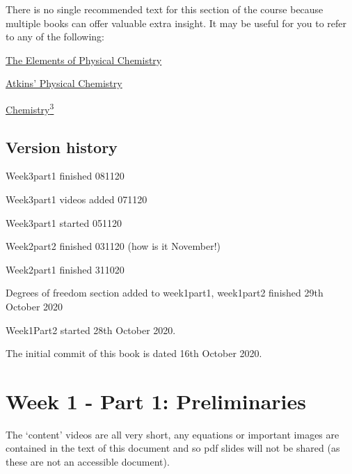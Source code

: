 \documentclass[
]{book}
\begin{document}
There is no single recommended text for this section of the course because multiple books can offer valuable extra insight. It may be useful for you to refer to any of the following:

\href{https://bath-ac-primo.hosted.exlibrisgroup.com/primo-explore/search?query=any,contains,Elements\%20of\%20physical\%20chemistry\&tab=local\&sortby=date\&vid=44BAT_VU1\&facet=frbrgroupid,include,978286819\&offset=0\&pcAvailability=false}{The Elements of Physical Chemistry}

\href{https://bath-ac-primo.hosted.exlibrisgroup.com/primo-explore/search?query=any,contains,physical\%20chemistry\%20de\%20paula\&tab=local\&search_scope=CSCOP_44BAT_DEEP\&sortby=date\&vid=44BAT_VU1\&facet=frbrgroupid,include,978327499\&offset=0\&pcAvailability=false}{Atkins' Physical Chemistry}

\href{https://bath-ac-primo.hosted.exlibrisgroup.com/primo-explore/search?query=any,contains,chemistry3\&tab=local\&search_scope=CSCOP_44BAT_DEEP\&sortby=date\&vid=44BAT_VU1\&facet=frbrgroupid,include,978293871\&offset=0\&pcAvailability=false}{Chemistry\textsuperscript{3}}

\hypertarget{version-history}{%
\section*{Version history}\label{version-history}}

Week3part1 finished 081120

Week3part1 videos added 071120

Week3part1 started 051120

Week2part2 finished 031120 (how is it November!)

Week2part1 finished 311020

Degrees of freedom section added to week1part1, week1part2 finished 29th October 2020

Week1Part2 started 28th October 2020.

The initial commit of this book is dated 16th October 2020.

\hypertarget{ch:Part1}{%
\chapter{Week 1 - Part 1: Preliminaries}\label{ch:Part1}}

The `content' videos are all very short, any equations or important images are contained in the text of this document and so pdf slides will not be shared (as these are not an accessible document).
\end{document}
